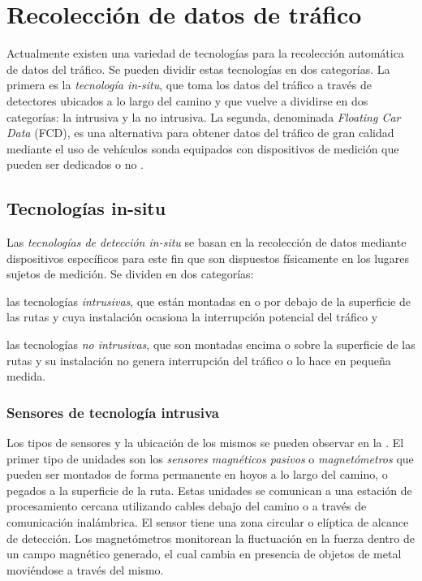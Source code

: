 \chapter{Recolección de datos de tráfico}
\label{cap:3}

Actualmente existen una variedad de tecnologías para la recolección automática de datos del tráfico. Se  pueden dividir estas tecnologías en dos categorías. La primera es la \emph{tecnología in-situ}, que toma los datos del tráfico a través de detectores ubicados a lo largo del camino y que vuelve a dividirse en dos categorías: la intrusiva y la no intrusiva. La segunda, denominada \emph{Floating Car Data} (FCD), es una alternativa para obtener datos del tráfico de gran calidad mediante el uso de vehículos sonda equipados con dispositivos de medición que pueden ser dedicados o no \citep{mimbela2003summary}.

\section{Tecnologías in-situ}

Las \emph{tecnologías de detección in-situ} se basan en la recolección de datos mediante dispositivos específicos para este fin que son dispuestos físicamente en los lugares sujetos de medición. Se dividen en dos categorías: \begin{enumerate*}[a)] \item las tecnologías \emph{intrusivas}, que están montadas en o por debajo de la superficie de las rutas y cuya instalación ocasiona la interrupción potencial del tráfico y \item las tecnologías \emph{no intrusivas}, que son montadas encima o sobre la superficie de las rutas y su instalación no genera interrupción del tráfico o lo hace en pequeña medida.\end{enumerate*}

\subsection{Sensores de tecnología intrusiva}

Los tipos de sensores y la ubicación de los mismos se pueden observar en la . El primer tipo de unidades son los \emph{sensores magnéticos pasivos} o  \emph{magnetómetros} que pueden ser montados de forma permanente en hoyos a lo largo del camino, o pegados a la superficie de la ruta. Estas unidades se comunican a una estación de procesamiento cercana utilizando cables debajo del camino o a través de comunicación inalámbrica. El sensor tiene una zona circular o elíptica de alcance de detección. Los magnetómetros monitorean la fluctuación en la fuerza dentro de un campo magnético generado, el cual cambia en presencia de objetos de metal moviéndose a través del mismo.

